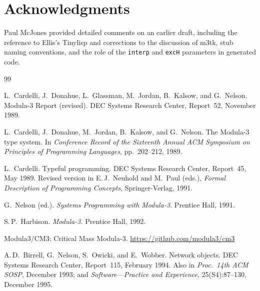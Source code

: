 \documentclass[11pt]{article}
\begin{document}
\section*{Acknowledgments}

Paul McJones provided detailed comments on an earlier draft, including
the reference to Ellis's Tinylisp and corrections to the discussion
of m3tk, stub naming conventions, and the role of the \texttt{interp}
and \texttt{excH} parameters in generated code.


\begin{thebibliography}{99}


L.~Cardelli, J.~Donahue, L.~Glassman, M.~Jordan, B.~Kalsow, and
G.~Nelson.
\newblock Modula-3 Report (revised).
\newblock DEC Systems Research Center, Report~52, November 1989.

L.~Cardelli, J.~Donahue, M.~Jordan, B.~Kalsow, and G.~Nelson.
\newblock The {Modula-3} type system.
\newblock In \emph{Conference Record of the Sixteenth Annual ACM
  Symposium on Principles of Programming Languages}, pp.~202--212,
  1989.

L.~Cardelli.
\newblock Typeful programming.
\newblock DEC Systems Research Center, Report~45, May 1989.
\newblock Revised version in E.\,J.\ Neuhold and M.\ Paul (eds.),
  \emph{Formal Description of Programming Concepts},
  Springer-Verlag, 1991.

G.~Nelson (ed.).
\newblock \emph{Systems Programming with Modula-3.}
\newblock Prentice Hall, 1991.

S.\,P.\ Harbison.
\newblock \emph{Modula-3.}
\newblock Prentice Hall, 1992.

Modula3/CM3: Critical Mass Modula-3.
\newblock \url{https://github.com/modula3/cm3}


A.\,D.\ Birrell, G.~Nelson, S.~Owicki, and E.~Wobber.
\newblock Network objects.
\newblock DEC Systems Research Center, Report~115, February 1994.
\newblock Also in \emph{Proc.\ 14th ACM SOSP}, December 1993; and
  \emph{Software---Practice and Experience},
  25(S4):87--130, December 1995.


\end{thebibliography}
\end{document}
